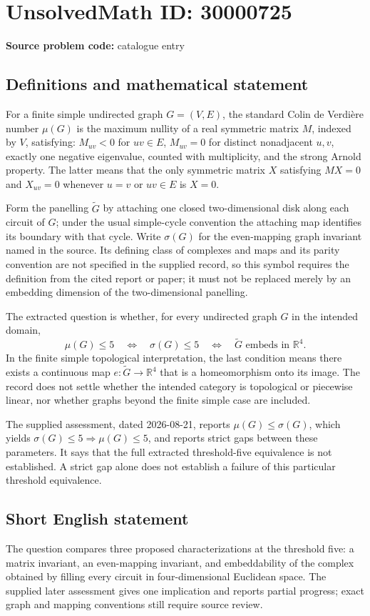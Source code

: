 \documentclass[11pt]{article}
\newcommand{\R}{\mathbb{R}}
\begin{document}
\section*{UnsolvedMath ID: 30000725}
\textbf{Source problem code:} catalogue entry
\subsection{Definitions and mathematical statement}
For a finite simple undirected graph \(G=(V,E)\), the standard Colin de Verdi\`ere number \(\mu(G)\) is the maximum nullity of a real symmetric matrix \(M\), indexed by \(V\), satisfying: \(M_{uv}<0\) for \(uv\in E\), \(M_{uv}=0\) for distinct nonadjacent \(u,v\), exactly one negative eigenvalue, counted with multiplicity, and the strong Arnold property. The latter means that the only symmetric matrix \(X\) satisfying \(MX=0\) and \(X_{uv}=0\) whenever \(u=v\) or \(uv\in E\) is \(X=0\).

Form the panelling \(\widetilde G\) by attaching one closed two-dimensional disk along each circuit of \(G\); under the usual simple-cycle convention the attaching map identifies its boundary with that cycle. Write \(\sigma(G)\) for the even-mapping graph invariant named in the source. Its defining class of complexes and maps and its parity convention are not specified in the supplied record, so this symbol requires the definition from the cited report or paper; it must not be replaced merely by an embedding dimension of the two-dimensional panelling.

The extracted question is whether, for every undirected graph \(G\) in the intended domain,
\[
 \mu(G)\leq5
 \quad\Longleftrightarrow\quad \sigma(G)\leq5
 \quad\Longleftrightarrow\quad
 \widetilde G\text{ embeds in }\R^4.
\]
In the finite simple topological interpretation, the last condition means there exists a continuous map \(e:\widetilde G\to\R^4\) that is a homeomorphism onto its image. The record does not settle whether the intended category is topological or piecewise linear, nor whether graphs beyond the finite simple case are included.

The supplied assessment, dated 2026-08-21, reports \(\mu(G)\leq\sigma(G)\), which yields \(\sigma(G)\leq5\Rightarrow\mu(G)\leq5\), and reports strict gaps between these parameters. It says that the full extracted threshold-five equivalence is not established. A strict gap alone does not establish a failure of this particular threshold equivalence.
\subsection{Short English statement}
The question compares three proposed characterizations at the threshold five: a matrix invariant, an even-mapping invariant, and embeddability of the complex obtained by filling every circuit in four-dimensional Euclidean space. The supplied later assessment gives one implication and reports partial progress; exact graph and mapping conventions still require source review.
\end{document}
